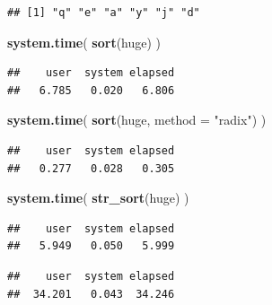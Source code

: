 \documentclass[
]{book}
\newenvironment{Shaded}{\begin{snugshade}}{\end{snugshade}}
\newcommand{\DataTypeTok}[1]{\textcolor[rgb]{0.13,0.29,0.53}{#1}}
\newcommand{\KeywordTok}[1]{\textcolor[rgb]{0.13,0.29,0.53}{\textbf{#1}}}
\newcommand{\NormalTok}[1]{#1}
\newcommand{\OperatorTok}[1]{\textcolor[rgb]{0.81,0.36,0.00}{\textbf{#1}}}
\newcommand{\StringTok}[1]{\textcolor[rgb]{0.31,0.60,0.02}{#1}}
\begin{document}
\begin{verbatim}
## [1] "q" "e" "a" "y" "j" "d"
\end{verbatim}

\begin{Shaded}
\begin{Highlighting}[]
\KeywordTok{system.time}\NormalTok{(}
  \KeywordTok{sort}\NormalTok{(huge)}
\NormalTok{)}
\end{Highlighting}
\end{Shaded}

\begin{verbatim}
##    user  system elapsed 
##   6.785   0.020   6.806
\end{verbatim}

\begin{Shaded}
\begin{Highlighting}[]
\KeywordTok{system.time}\NormalTok{(}
  \KeywordTok{sort}\NormalTok{(huge, }\DataTypeTok{method =} \StringTok{"radix"}\NormalTok{)}
\NormalTok{)}
\end{Highlighting}
\end{Shaded}

\begin{verbatim}
##    user  system elapsed 
##   0.277   0.028   0.305
\end{verbatim}

\begin{Shaded}
\begin{Highlighting}[]
\KeywordTok{system.time}\NormalTok{(}
  \KeywordTok{str_sort}\NormalTok{(huge)}
\NormalTok{)}
\end{Highlighting}
\end{Shaded}

\begin{verbatim}
##    user  system elapsed 
##   5.949   0.050   5.999
\end{verbatim}

\begin{Shaded}
\end{Shaded}

\begin{verbatim}
##    user  system elapsed 
##  34.201   0.043  34.246
\end{verbatim}
\end{document}
